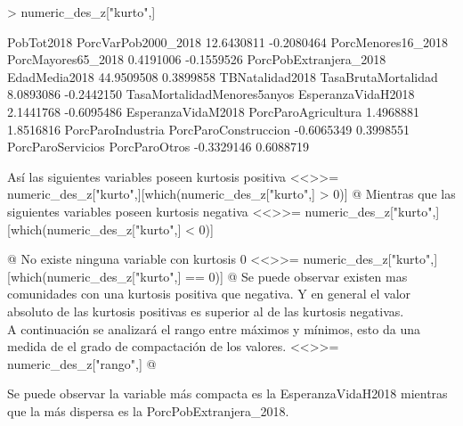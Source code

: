 \documentclass[11pt]{article}
\begin{document}
\begin{Schunk}
\begin{Sinput}
> numeric_des_z["kurto",]
\end{Sinput}
\begin{Soutput}
                 PobTot2018         PorcVarPob2000_2018 
                 12.6430811                  -0.2080464 
         PorcMenores16_2018          PorcMayores65_2018 
                  0.4191006                  -0.1559526 
     PorcPobExtranjera_2018               EdadMedia2018 
                 44.9509508                   0.3899858 
            TBNatalidad2018         TasaBrutaMortalidad 
                  8.0893086                  -0.2442150 
TasaMortalidadMenores5anyos          EsperanzaVidaH2018 
                  2.1441768                  -0.6095486 
         EsperanzaVidaM2018         PorcParoAgricultura 
                  1.4968881                   1.8516816 
          PorcParoIndustria        PorcParoConstruccion 
                 -0.6065349                   0.3998551 
          PorcParoServicios               PorcParoOtros 
                 -0.3329146                   0.6088719 
\end{Soutput}
\end{Schunk}
 Así las siguientes variables poseen kurtosis positiva
 <<>>=
 numeric_des_z["kurto",][which(numeric_des_z["kurto",] > 0)]
 @
 Mientras que las siguientes variables poseen kurtosis negativa
 <<>>=
 numeric_des_z["kurto",][which(numeric_des_z["kurto",] < 0)]

 @
 No existe ninguna variable con kurtosis 0
 <<>>=
 numeric_des_z["kurto",][which(numeric_des_z["kurto",] == 0)]
 @
 Se puede observar existen mas comunidades con una kurtosis positiva que negativa. Y en general el valor absoluto de las kurtosis positivas es superior al de las kurtosis negativas. \\
 A continuación se analizará el rango entre máximos y mínimos, esto da una medida de el grado de compactación de los valores. 
    <<>>=
    numeric_des_z["rango",]
    @
    
 Se puede observar la variable más compacta es la EsperanzaVidaH2018 mientras que la más dispersa es la PorcPobExtranjera\_2018. \\
\end{document}
